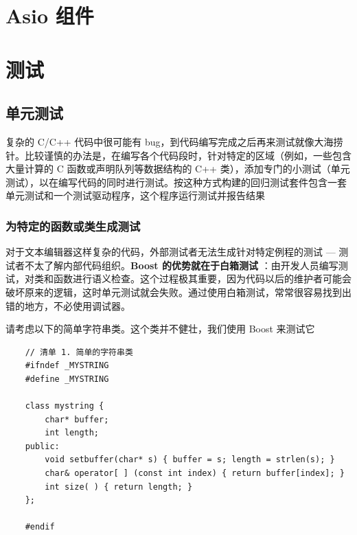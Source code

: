 \documentclass[UTF8,a4paper,12pt]{ctexbook}
\begin{document}
\chapter{Asio 组件}



\newpage
\chapter{测试}
	\section{单元测试}
		复杂的 C/C++ 代码中很可能有 bug，到代码编写完成之后再来测试就像大海捞针。比较谨慎的办法是，在编写各个代码段时，针对特定的区域（例如，一些包含大量计算的 C 函数或声明队列等数据结构的 C++ 类），添加专门的小测试（单元测试），以在编写代码的同时进行测试。按这种方式构建的回归测试套件包含一套单元测试和一个测试驱动程序，这个程序运行测试并报告结果
		
	\subsection{为特定的函数或类生成测试}
		对于文本编辑器这样复杂的代码，外部测试者无法生成针对特定例程的测试 — 测试者不太了解内部代码组织。\textbf{Boost 的优势就在于白箱测试} ：由开发人员编写测试，对类和函数进行语义检查。这个过程极其重要，因为代码以后的维护者可能会破坏原来的逻辑，这时单元测试就会失败。通过使用白箱测试，常常很容易找到出错的地方，不必使用调试器。
		
		请考虑以下的简单字符串类。这个类并不健壮，我们使用 Boost 来测试它
			\begin{lstlisting}
	// 清单 1. 简单的字符串类
	#ifndef _MYSTRING
	#define _MYSTRING
	
	class mystring { 
		char* buffer; 
		int length;
	public: 
		void setbuffer(char* s) { buffer = s; length = strlen(s); } 
		char& operator[ ] (const int index) { return buffer[index]; }
		int size( ) { return length; }
	}; 
	
	#endif
			\end{lstlisting}
		
\end{document}
